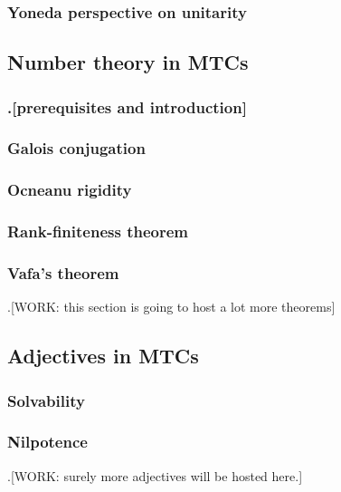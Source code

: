\documentclass{article}
\theoremstyle{definition}
\newcommand{\0}{\left|0\right>}
\newcommand{\1}{\left|1\right>}
\numberwithin{figure}{section}
\begin{document}
\subsubsection{Yoneda perspective on unitarity}




\subsection{Number theory in MTCs}

\subsubsection{.[prerequisites and introduction]}

\subsubsection{Galois conjugation}

\subsubsection{Ocneanu rigidity}

\subsubsection{Rank-finiteness theorem}

\subsubsection{Vafa's theorem}

.[WORK: this section is going to host a lot more theorems]




\subsection{Adjectives in MTCs}

\subsubsection{Solvability}

\subsubsection{Nilpotence}

.[WORK: surely more adjectives will be hosted here.]
\end{document}
